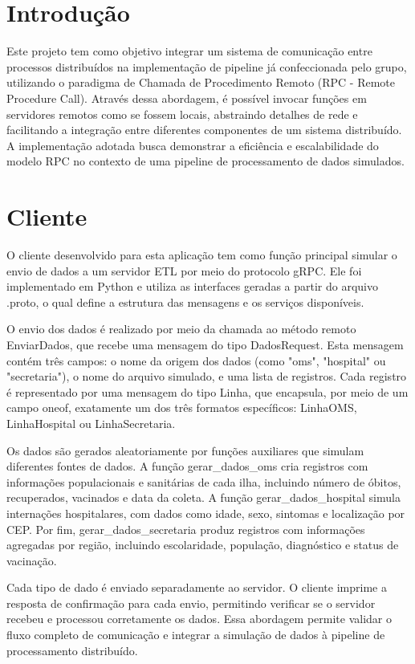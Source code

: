 \documentclass{article}
\begin{document}
\tableofcontents

\newpage


\section{Introdução}
Este projeto tem como objetivo integrar um sistema de comunicação entre processos distribuídos na implementação de pipeline já confeccionada pelo grupo, utilizando o paradigma de Chamada de Procedimento Remoto (RPC - Remote Procedure Call). Através dessa abordagem, é possível invocar funções em servidores remotos como se fossem locais, abstraindo detalhes de rede e facilitando a integração entre diferentes componentes de um sistema distribuído. A implementação adotada busca demonstrar a eficiência e escalabilidade do modelo RPC no contexto de uma pipeline de processamento de dados simulados.

\section{Cliente}
O cliente desenvolvido para esta aplicação tem como função principal simular o envio de dados a um servidor ETL por meio do protocolo gRPC. Ele foi implementado em Python e utiliza as interfaces geradas a partir do arquivo .proto, o qual define a estrutura das mensagens e os serviços disponíveis.

O envio dos dados é realizado por meio da chamada ao método remoto EnviarDados, que recebe uma mensagem do tipo DadosRequest. Esta mensagem contém três campos: o nome da origem dos dados (como "oms", "hospital" ou "secretaria"), o nome do arquivo simulado, e uma lista de registros. Cada registro é representado por uma mensagem do tipo Linha, que encapsula, por meio de um campo oneof, exatamente um dos três formatos específicos: LinhaOMS, LinhaHospital ou LinhaSecretaria.

Os dados são gerados aleatoriamente por funções auxiliares que simulam diferentes fontes de dados. A função gerar\_dados\_oms cria registros com informações populacionais e sanitárias de cada ilha, incluindo número de óbitos, recuperados, vacinados e data da coleta. A função gerar\_dados\_hospital simula internações hospitalares, com dados como idade, sexo, sintomas e localização por CEP. Por fim, gerar\_dados\_secretaria produz registros com informações agregadas por região, incluindo escolaridade, população, diagnóstico e status de vacinação.

Cada tipo de dado é enviado separadamente ao servidor. O cliente imprime a resposta de confirmação para cada envio, permitindo verificar se o servidor recebeu e processou corretamente os dados. Essa abordagem permite validar o fluxo completo de comunicação e integrar a simulação de dados à pipeline de processamento distribuído.
\end{document}
